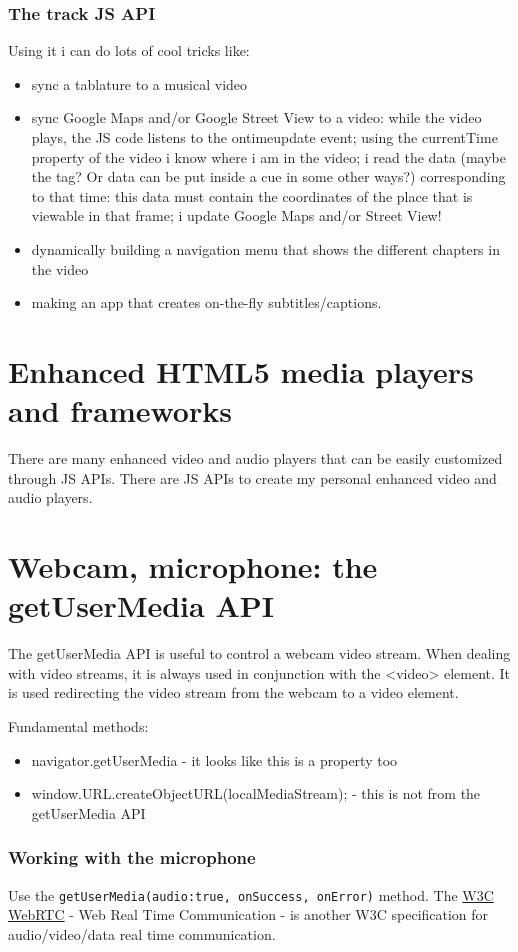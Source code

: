\documentclass[a4paper,11pt]{book}
\begin{document}
	\subsubsection{The track JS API}
	Using it i can do lots of cool tricks like:
	\begin{itemize}
	\item sync a tablature to a musical video
	\item sync Google Maps and/or Google Street View to a video: while the video plays, the JS code listens
		to the ontimeupdate event; using the currentTime property of the video i know where i am in the video;
		i read the data (maybe the tag? Or data can be put inside a cue in some other ways?) corresponding to
		that time: this data must contain the coordinates of the place that is viewable in that frame; i update
		Google Maps and/or Street View!
	\item dynamically building a navigation menu that shows the different chapters in the video
	\item making an app that creates on-the-fly subtitles/captions.
	\end{itemize}
	
	\section{Enhanced HTML5 media players and frameworks}
	There are many enhanced video and audio players that can be easily customized through JS APIs. There are
	JS APIs to create my personal enhanced video and audio players.
	
	\section{Webcam, microphone: the getUserMedia API}
	The getUserMedia API is useful to control a webcam video stream. When dealing with video streams, it is
	always used in conjunction with the <video> element. It is used redirecting the video stream from the
	webcam to a video element.
	
	Fundamental methods:
	\begin{itemize}
	\item navigator.getUserMedia - it looks like this is a property too
	\item window.URL.createObjectURL(localMediaStream); - this is not from the getUserMedia API
	\end{itemize}
	
	\subsubsection{Working with the microphone}
	Use the \texttt{getUserMedia({audio:true}, onSuccess, onError)} method.
	The \href{http://www.w3.org/TR/webrtc/}{W3C WebRTC} - Web Real Time Communication - is another W3C
	specification for audio/video/data real time communication.
	
\end{document}

